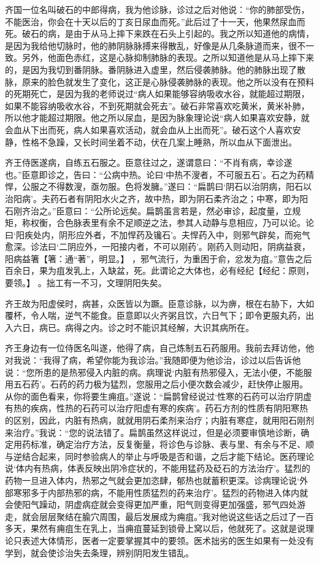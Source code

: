 \documentclass[12pt,UTF8]{ctexbook}
\begin{document}
齐国一位名叫破石的中郎得病，我为他诊脉，诊过之后对他说：“你的肺部受伤，不能医治，你会在十天以后的丁亥日尿血而死。”此后过了十一天，他果然尿血而死。破石的病，是由于从马上摔下来跌在石头上引起的。我之所以知道他的病情，是因为我给他切脉时，他的肺阴脉脉搏来得散乱，好像是从几条脉道而来，很不一致。另外，他面色赤红，这是心脉抑制肺脉的表现。之所以知道他是从马上摔下来的，是因为我切到番阴脉。番阴脉进入虚里，然后侵袭肺脉。他的肺脉出现了散脉，原来的脸色就发生了变化，这正是心脉侵袭肺脉的表现。他之所以没有在预料的死期死亡，是因为我的老师说过“病人如果能够容纳吸收水谷，就能超过期限，如果不能容纳吸收水谷，不到死期就会死去”。破石非常喜欢吃黄米，黄米补肺，所以他才能超过期限。他之所以尿血，是因为脉象理论说“病人如果喜欢安静，就会血从下出而死，病人如果喜欢活动，就会血从上出而死”。破石这个人喜欢安静，性格不急躁，又长时间坐着不动，伏在几案上睡熟，所以血从下面泄出。

齐王侍医遂病，自练五石服之。臣意往过之，遂谓意曰：“不肖有病，幸诊遂也。”臣意即诊之，告曰：“公病中热。论曰‘中热不溲者，不可服五石’。石之为药精悍，公服之不得数溲，亟勿服。色将发臃。”遂曰：“扁鹊曰‘阴石以治阴病，阳石以治阳病’。夫药石者有阴阳水火之齐，故中热，即为阴石柔齐治之；中寒，即为阳石刚齐治之。”臣意曰：“公所论远矣。扁鹊虽言若是，然必审诊，起度量，立规矩，称权衡，合色脉表里有余不足顺逆之法，参其人动静与息相应，乃可以论。论曰‘阳疾处内，阴形应外者，不加悍药及镵石’。夫悍药入中，则邪气辟矣，而宛气愈深。诊法曰‘二阴应外，一阳接内者，不可以刚药’。刚药入则动阳，阴病益衰，阳病益箸【箸：通“著”，明显。】 ，邪气流行，为重困于俞，忿发为疽。”意告之后百余日，果为疽发乳上，入缺盆，死。此谓论之大体也，必有经纪【经纪：原则，要领。】 。拙工有一不习，文理阴阳失矣。

齐王故为阳虚侯时，病甚，众医皆以为蹶。臣意诊脉，以为痹，根在右胁下，大如覆杯，令人喘，逆气不能食。臣意即以火齐粥且饮，六日气下；即令更服丸药，出入六日，病已。病得之内。诊之时不能识其经解，大识其病所在。

齐王身边有一位侍医名叫遂，他得了病，自己炼制五石药服用。我前去拜访他，他对我说：“我得了病，希望你能为我诊治。”我随即便为他诊治，诊过以后告诉他说：“您所患的是热邪侵入内脏的病。病理说‘内脏有热邪侵入，无法小便，不能服用五石药’。石药的药力极为猛烈，您服用之后小便次数会减少，赶快停止服用。从你的面色看来，你将要生痈疽。”遂说：“扁鹊曾经说过‘性寒的石药可以治疗阴虚有热的疾病，性热的石药可以治疗阳虚有寒的疾病’。药石方剂的性质有阴阳寒热的区别，因此，内脏有热病，就就用阴石柔剂来治疗；内脏有寒症，就用阳石刚剂来治疗。”我说：“您的说法错了。扁鹊虽然这样说过，但是必须要审慎地诊断，确定用药标准，确定治疗方法，反复衡量，将诊色与诊脉、表与里、有余与不足、顺与逆结合起来，同时参验病人的举止与呼吸是否和谐，之后才能下结论。医药理论说‘体内有热病，体表反映出阴冷症状的，不能用猛药及砭石的方法治疗’。猛烈的药物一旦进入体内，热邪之气就会更加恣肆，郁热也就蓄积更深。诊病理论说‘外部寒邪多于内部热邪的病，不能用性质猛烈的药来治疗’。猛烈的药物进入体内就会使阳气躁动，阴虚病症就会变得更加严重，阳气则变得更加强盛，邪气四处游走，就会层层聚结在腧穴周围，最后发展成为痈疽。”我对他说这些话之后过了一百多天，果然有痈疽生在乳上，当痈疽蔓延到锁骨上窝以后，他就死了。这就是说理论只表述大体情形，医者一定要掌握其中的要领。医术拙劣的医生如果有一处没有学到，就会使诊治失去条理，辨别阴阳发生错乱。
\end{document}
